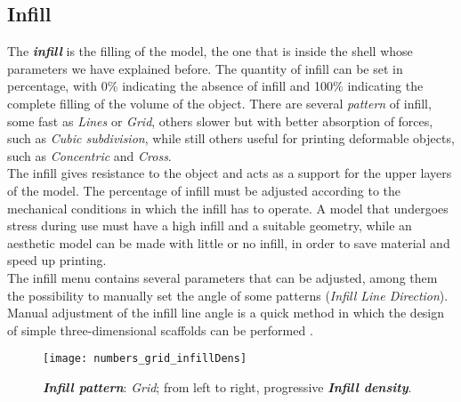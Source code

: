 \subsection{Infill}
The \emph{\textbf{infill}} is the filling of the model, the one that is inside the shell whose parameters we have explained before. The quantity of infill can be set in percentage, with 0\% indicating the absence of infill and 100\% indicating the complete filling of the volume of the object. There are several \emph{pattern} of infill, some fast as \emph{Lines} or \emph{Grid}, others slower but with better absorption of forces, such as \emph{Cubic subdivision}, while still others useful for printing deformable objects, such as \emph{Concentric} and \emph{Cross}. \\
The infill gives resistance to the object and acts as a support for the upper layers of the model. The percentage of infill must be adjusted according to the mechanical conditions in which the infill has to operate. A model that undergoes stress during use must have a high infill and a suitable geometry, while an aesthetic model can be made with little or no infill, in order to save material and speed up printing.\\
The infill menu contains several parameters that can be adjusted, among them the possibility to manually set the angle of some patterns (\emph{Infill Line Direction}). Manual adjustment of the infill line angle is a quick method in which the design of simple three-dimensional scaffolds can be performed \parencite{Reference138}.

\begin{figure}[h]
    \centering
    \texttt{[image: numbers\_grid\_infillDens]}
    \caption{\emph{\textbf{Infill pattern}}: \emph{Grid}; from left to right, progressive \emph{\textbf{Infill density}}.}
    \label{fig:numbers_grid_infillDens}
\end{figure}
	

